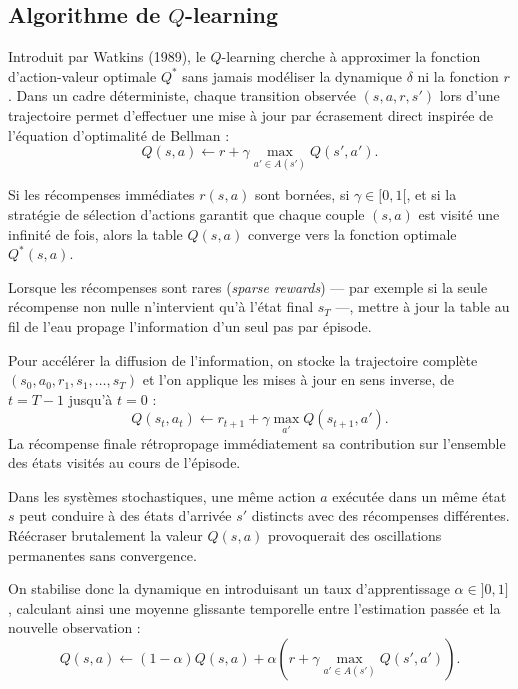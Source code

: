 \subsection{Algorithme de $Q$-learning}

Introduit par Watkins (1989), le $Q$-learning cherche à approximer la fonction d'action-valeur optimale $Q^*$ sans jamais modéliser la dynamique $\delta$ ni la fonction $r$. Dans un cadre déterministe, chaque transition observée $(s, a, r, s')$ lors d'une trajectoire permet d'effectuer une mise à jour par écrasement direct inspirée de l'équation d'optimalité de Bellman :
\begin{equation}
    Q(s, a) \longleftarrow r + \gamma \max_{a' \in A(s')} Q(s', a').
\end{equation}

\begin{theorem}
    Si les récompenses immédiates $r(s,a)$ sont bornées, si $\gamma \in [0, 1[$, et si la stratégie de sélection d'actions garantit que chaque couple $(s, a)$ est visité une infinité de fois, alors la table $Q(s, a)$ converge vers la fonction optimale $Q^*(s, a)$.
\end{theorem}

\begin{remark}
    Lorsque les récompenses sont rares (\emph{sparse rewards}) — par exemple si la seule récompense non nulle n'intervient qu'à l'état final $s_T$ —, mettre à jour la table au fil de l'eau propage l'information d'un seul pas par épisode.
    
    Pour accélérer la diffusion de l'information, on stocke la trajectoire complète $(s_0, a_0, r_1, s_1, \dots, s_T)$ et l'on applique les mises à jour en sens inverse, de $t = T-1$ jusqu'à $t = 0$ :
    \begin{equation}
        Q(s_t, a_t) \longleftarrow r_{t+1} + \gamma \max_{a'} Q(s_{t+1}, a').
    \end{equation}
    La récompense finale rétropropage immédiatement sa contribution sur l'ensemble des états visités au cours de l'épisode.
\end{remark}

\begin{proposition}
    Dans les systèmes stochastiques, une même action $a$ exécutée dans un même état $s$ peut conduire à des états d'arrivée $s'$ distincts avec des récompenses différentes. Réécraser brutalement la valeur $Q(s, a)$ provoquerait des oscillations permanentes sans convergence.

    On stabilise donc la dynamique en introduisant un taux d'apprentissage $\alpha \in ]0, 1]$, calculant ainsi une moyenne glissante temporelle entre l'estimation passée et la nouvelle observation :
    \begin{equation}
        Q(s, a) \longleftarrow (1 - \alpha) Q(s, a) + \alpha \left( r + \gamma \max_{a' \in A(s')} Q(s', a') \right).
    \end{equation}
\end{proposition}

